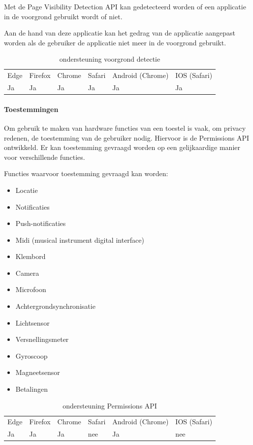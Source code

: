 Met de Page Visibility Detection API \autocite{Grigorik2020} kan gedetecteerd worden of een applicatie in de voorgrond gebruikt wordt of niet. 

Aan de hand van deze applicatie kan het gedrag van de applicatie aangepast worden als de gebruiker de applicatie niet meer in de voorgrond gebruikt.

\begin{table}[H]
	\centering
	\begin{tabular}{llllll}
		Edge & Firefox & Chrome & Safari & Android (Chrome) & IOS (Safari) \\
		Ja   & Ja      &  Ja     & Ja     & Ja               & Ja          
	\end{tabular}	
	\caption{ondersteuning voorgrond detectie }
	\label{ondersteuning voorgrond detectie}
\end{table}


\paragraph{Toestemmingen}

Om gebruik te maken van hardware functies van een toestel is vaak, om privacy redenen, de toestemming van de gebruiker nodig. Hiervoor is de Permissions API \autocite{Caceres2020} ontwikkeld. Er kan toestemming gevraagd worden op een gelijkaardige manier voor verschillende functies.

Functies waarvoor toestemming gevraagd kan worden:
 \begin{itemize}
	\item	Locatie
	\item	Notificaties
	\item	Push-notificaties
	\item	Midi (musical instrument digital interface)
	\item	Klembord
	\item	Camera
	\item	Microfoon
	\item	Achtergrondsynchronisatie
	\item	Lichtsensor
	\item	Versnellingsmeter
	\item	Gyroscoop
	\item	Magneetsensor
	\item	Betalingen
\end{itemize}

	\begin{table}[H]
		\centering
		\begin{tabular}{llllll}
			Edge & Firefox & Chrome & Safari & Android (Chrome) & IOS (Safari) \\
			Ja   & Ja      &  Ja     & nee     & Ja               & nee          
		\end{tabular}	
		\caption{ondersteuning Permissions API }
		\label{ondersteuning Permission API}
	\end{table}
	

